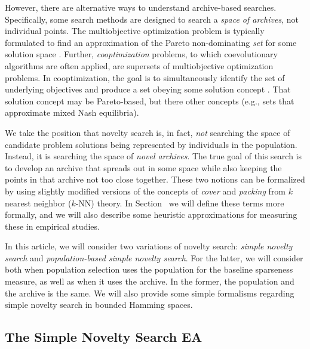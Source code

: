\documentclass[twoside]{article}
\begin{document}
However, there are alternative ways to understand archive-based searches.  Specifically, some search methods are designed to search a \emph{space of archives}, not individual points.  The multiobjective optimization problem is typically formulated to find an approximation of the Pareto non-dominating \emph{set} for some solution space \citep{SeadaDeb2018moo,Zitzler2012,Zitzler2000ecj}.  Further, \emph{cooptimization} problems, to which coevolutionary algorithms are often applied, are supersets of multiobjective optimization problems.  In cooptimization, the goal is to simultaneously identify the set of underlying objectives and produce a set obeying some solution concept \citep{FiciciPollack2001ecal,BucciPollack2002foga,Popovici2012,Ficici2008mpsn}.  That solution concept may be Pareto-based, but there other concepts (e.g., sets that approximate mixed Nash equilibria).

We take the position that novelty search is, in fact, \emph{not} searching the space of candidate problem solutions being represented by individuals in the population.  Instead, it is searching the space of \emph{novel archives}.  The true goal of this search is to develop an archive that spreads out in some space while also keeping the points in that archive not too close together.  These two notions can be formalized by using slightly modified versions of the concepts of \emph{cover} and \emph{packing} from $k$ nearest neighbor ($k$-NN) theory.  In Section~\pageref{subsec:knn} we will define these terms more formally, and we will also describe some heuristic approximations for measuring these in empirical studies.

In this article, we will consider two variations of novelty search:  \emph{simple novelty search} and \emph{population-based simple novelty search}.  For the latter, we will consider both when population selection uses the population for the baseline sparseness measure, as well as when it uses the archive.   In the former, the population and the archive is the same.  We will also provide some simple formalisms regarding  simple novelty search in bounded Hamming spaces.

\subsection{The Simple Novelty Search EA}
\label{subsec:sns}
\end{document}
